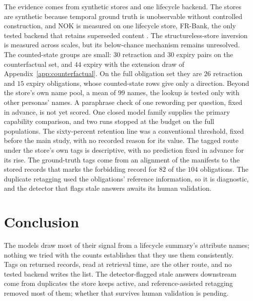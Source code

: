 \documentclass{article}
\begin{document}
The evidence comes from synthetic stores and one lifecycle backend.
The stores are synthetic because temporal ground truth is unobservable without controlled construction, and NOK is measured on one lifecycle store, FR-Bank, the only tested backend that retains superseded content \citep{fr}.
The structureless-store inversion is measured across scales, but its below-chance mechanism remains unresolved.
The counted-state groups are small: $30$ retraction and $30$ expiry pairs on the counterfactual set, and $44$ expiry with the extension draw of Appendix~\ref{app:counterfactual}. On the full obligation set they are $26$ retraction and $15$ expiry obligations, whose counted-state rows give only a direction.
Beyond the store's own name pool, a mean of $99$ names, the lookup is tested only with other personas' names. A paraphrase check of one rewording per question, fixed in advance, is not yet scored.
One closed model family supplies the primary capability comparison, and two runs stopped at the budget on the full populations.
The sixty-percent retention line was a conventional threshold, fixed before the main study, with no recorded reason for its value.
The tagged route under the store's own tags is descriptive, with no prediction fixed in advance for its rise.
The ground-truth tags come from an alignment of the manifests to the stored records that marks the forbidding record for $82$ of the $104$ obligations.
The duplicate retagging used the obligations' reference information, so it is diagnostic, and the detector that flags stale answers awaits its human validation.

\section{Conclusion}\label{sec:conclusion}

The models draw most of their signal from a lifecycle summary's attribute names; nothing we tried with the counts establishes that they use them consistently.
Tags on returned records, read at retrieval time, are the other route, and no tested backend writes the list.
The detector-flagged stale answers downstream come from duplicates the store keeps active, and reference-assisted retagging removed most of them; whether that survives human validation is pending.
\end{document}

